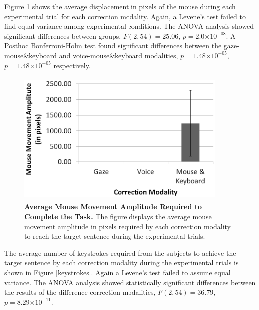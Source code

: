 \documentclass[]{article}
\providecommand{\e}[1]{\ensuremath{\times 10^{#1}}}
\begin{document}
Figure \ref{mouseDisplacement} shows the average displacement in pixels of the mouse during each experimental trial for
each correction modality. Again, a Levene's test failed to find equal variance among experimental conditions. The ANOVA
analysis showed significant differences between groups,  $F(2,54)=25.06$, $p=2.0\e{-08}$. A Posthoc Bonferroni-Holm test
found significant differences between the gaze-mouse\&keyboard and voice-mouse\&keyboard modalities,  $p=1.48\e{-05}$,
$p=1.48\e{-05}$ respectively.


\begin{figure}[ht]
\begin{center}
\vspace{-3mm}
\includegraphics[width=0.9\textwidth,height=65mm]{figures/mouseDisplacement.png}
\end{center}
\caption{\textbf{Average Mouse Movement Amplitude Required to Complete the Task.} The figure displays the average mouse
movement amplitude in pixels required by each correction modality to reach the target sentence during the experimental trials.}
\label{mouseDisplacement}
\end{figure}


The average number of keystrokes required from the subjects to achieve the target sentence by each correction modality
during the experimental trials is shown in Figure \ref{keystrokes}. Again a Levene's test failed to assume equal
variance. The ANOVA analysis showed statistically significant differences between the results of the
difference correction modalities, $F(2,54)=36.79$, $p=8.29\e{-11}$. 
\end{document}

